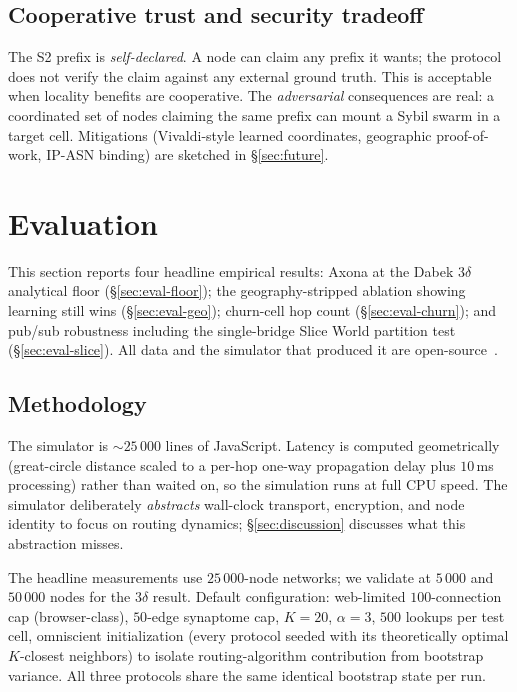 \documentclass[conference]{IEEEtran}
\newcommand{\axona}{Axona\xspace}
\begin{document}
\subsection{Cooperative trust and security tradeoff}
The S2 prefix is \emph{self-declared}.  A node can claim any
prefix it wants; the protocol does not verify the claim against
any external ground truth.  This is acceptable when locality
benefits are cooperative.  The \emph{adversarial} consequences
are real: a coordinated set of nodes claiming the same prefix
can mount a Sybil swarm in a target cell.  Mitigations
(Vivaldi-style learned coordinates, geographic proof-of-work,
IP-ASN binding) are sketched in \S\ref{sec:future}.

\section{Evaluation}
\label{sec:eval}

This section reports four headline empirical results: \axona at
the Dabek $3\delta$ analytical floor (\S\ref{sec:eval-floor});
the geography-stripped ablation showing learning still wins
(\S\ref{sec:eval-geo}); churn-cell hop count
(\S\ref{sec:eval-churn}); and pub/sub robustness including the
single-bridge Slice World partition test
(\S\ref{sec:eval-slice}).  All data and the simulator that
produced it are open-source~\cite{dhtsim2026}.

\subsection{Methodology}
\label{sec:eval-method}

The simulator is $\sim\!25\,000$ lines of JavaScript.  Latency
is computed geometrically (great-circle distance scaled to a
per-hop one-way propagation delay plus $10$\,ms processing)
rather than waited on, so the simulation runs at full CPU
speed.  The simulator deliberately \emph{abstracts} wall-clock
transport, encryption, and node identity to focus on routing
dynamics; \S\ref{sec:discussion} discusses what this abstraction
misses.

The headline measurements use $25\,000$-node networks; we
validate at $5\,000$ and $50\,000$ nodes for the $3\delta$
result.  Default configuration: web-limited $100$-connection
cap (browser-class), $50$-edge synaptome cap, $K=20$,
$\alpha=3$, $500$ lookups per test cell, omniscient
initialization (every protocol seeded with its theoretically
optimal $K$-closest neighbors) to isolate routing-algorithm
contribution from bootstrap variance.  All three protocols
share the same identical bootstrap state per run.
\end{document}
